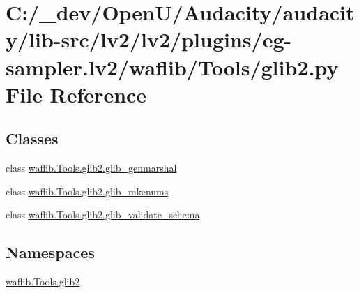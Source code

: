 \hypertarget{lv2_2plugins_2eg-sampler_8lv2_2waflib_2_tools_2glib2_8py}{}\section{C\+:/\+\_\+dev/\+Open\+U/\+Audacity/audacity/lib-\/src/lv2/lv2/plugins/eg-\/sampler.lv2/waflib/\+Tools/glib2.py File Reference}
\label{lv2_2plugins_2eg-sampler_8lv2_2waflib_2_tools_2glib2_8py}
\subsection*{Classes}
\begin{DoxyCompactItemize}
\item 
class \hyperlink{classwaflib_1_1_tools_1_1glib2_1_1glib__genmarshal}{waflib.\+Tools.\+glib2.\+glib\+\_\+genmarshal}
\item 
class \hyperlink{classwaflib_1_1_tools_1_1glib2_1_1glib__mkenums}{waflib.\+Tools.\+glib2.\+glib\+\_\+mkenums}
\item 
class \hyperlink{classwaflib_1_1_tools_1_1glib2_1_1glib__validate__schema}{waflib.\+Tools.\+glib2.\+glib\+\_\+validate\+\_\+schema}
\end{DoxyCompactItemize}
\subsection*{Namespaces}
\begin{DoxyCompactItemize}
\item 
 \hyperlink{namespacewaflib_1_1_tools_1_1glib2}{waflib.\+Tools.\+glib2}
\end{DoxyCompactItemize}
